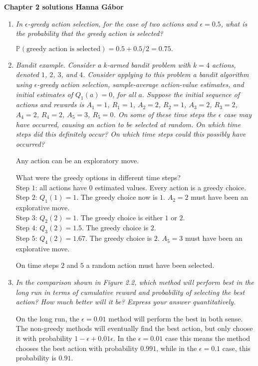 \documentclass[12pt,a4paper]{article}
\begin{document}
\textbf{Chapter 2 solutions  \hfill Hanna Gábor}

\begin{enumerate}
  \item
    \textit{In $\epsilon$-greedy action selection, for the case of two actions and $\epsilon = 0.5$, what is the probability that the greedy action is selected?}

    $\mathbb{P}(\text{greedy action is selected}) = 0.5 + 0.5/2 = 0.75.$

  \item
    \textit{Bandit example. Consider a $k$-armed bandit problem with $k = 4$ actions, denoted $1$, $2$, $3$, and $4$. Consider applying to this problem a bandit algorithm using $\epsilon$-greedy action selection, sample-average action-value estimates, and initial estimates of $Q_1(a) = 0$, for all $a$. Suppose the initial sequence of actions and rewards is $A_1 = 1$, $R_1 = 1$, $A_2 = 2$, $R_2 = 1$, $A_3 = 2$, $R_3 = 2$, $A_4 = 2$,
    $R_4 = 2$, $A_5 = 3$, $R_5 = 0$. On some of these time steps the $\epsilon$ case may have occurred, causing an action to be selected at random. On which time steps did this definitely occur? On which time steps could this possibly have occurred?}

    Any action can be an exploratory move.

    What were the greedy options in different time steps?\\
    Step $1$: all actions have $0$ estimated values. Every action is a greedy choice.\\
    Step $2$: $Q_1(1) = 1$. The greedy choice now is $1$. $A_2 = 2$ must have been an\\ explorative move.\\
    Step $3$: $Q_2(2) = 1$. The greedy choice is either $1$ or $2$.\\
    Step $4$: $Q_3(2) = 1.5$. The greedy choice is $2$.\\
    Step $5$: $Q_4(2) = 1.67$. The greedy choice is $2$. $A_5 = 3$ must have been an explorative move.

    On time steps $2$ and $5$ a random action must have been selected.

 \item
    \textit{In the comparison shown in Figure 2.2, which method will perform best in
    the long run in terms of cumulative reward and probability of selecting the best action?
    How much better will it be? Express your answer quantitatively.}

    On the long run, the $\epsilon = 0.01$ method will perform the best in both sense.
    The non-greedy methods will eventually find the best action, but only choose it
    with probability $1 - \epsilon + 0.01 \epsilon $. In the $\epsilon = 0.01$ case this means the method
    chooses the best action with probability $0.991$, while in the $\epsilon = 0.1$ case,
    this probability is $0.91$.


\end{enumerate}
\end{document}
